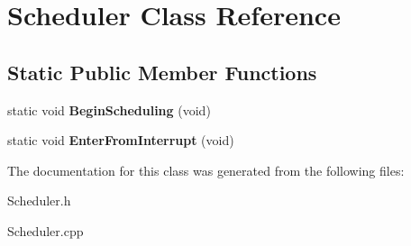 \hypertarget{class_scheduler}{}\section{Scheduler Class Reference}
\label{class_scheduler}
\subsection*{Static Public Member Functions}
\begin{DoxyCompactItemize}
\item 
\mbox{\label{class_scheduler_ac99e696798082d7597bbe1141a79ecd8}} 
static void {\bfseries Begin\+Scheduling} (void)
\item 
\mbox{\label{class_scheduler_a8165a6caa9492a66058238848b87110c}} 
static void {\bfseries Enter\+From\+Interrupt} (void)
\end{DoxyCompactItemize}


The documentation for this class was generated from the following files\+:\begin{DoxyCompactItemize}
\item 
Scheduler.\+h\item 
Scheduler.\+cpp\end{DoxyCompactItemize}
